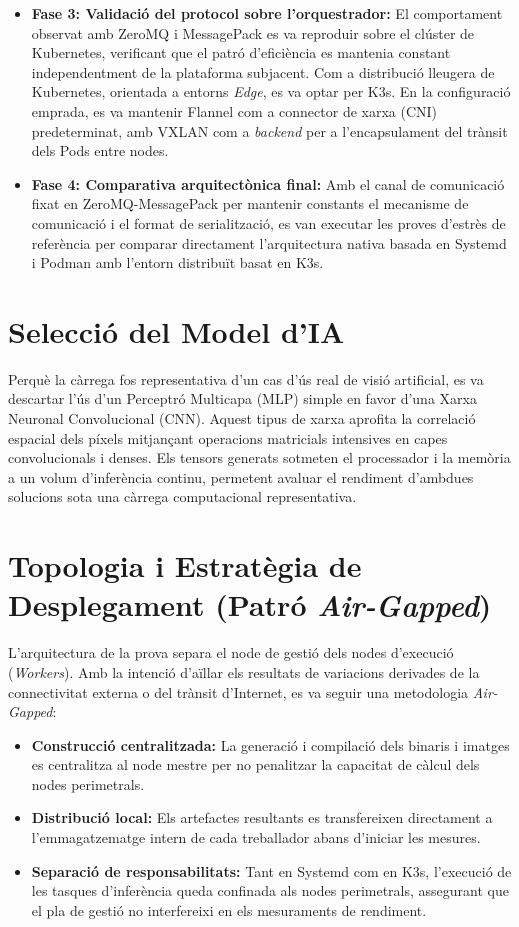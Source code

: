 \begin{itemize}
\begin{itemize}
    \end{itemize}
    \item \textbf{Fase 3: Validació del protocol sobre l'orquestrador:} El comportament observat amb ZeroMQ i MessagePack es va reproduir sobre el clúster de Kubernetes, verificant que el patró d'eficiència es mantenia constant independentment de la plataforma subjacent. Com a distribució lleugera de Kubernetes, orientada a entorns \textit{Edge}, es va optar per K3s. En la configuració emprada, es va mantenir Flannel com a connector de xarxa (CNI) predeterminat, amb VXLAN com a \textit{backend} per a l'encapsulament del trànsit dels Pods entre nodes.
    \item \textbf{Fase 4: Comparativa arquitectònica final:} Amb el canal de comunicació fixat en ZeroMQ-MessagePack per mantenir constants el mecanisme de comunicació i el format de serialització, es van executar les proves d'estrès de referència per comparar directament l'arquitectura nativa basada en Systemd i Podman amb l'entorn distribuït basat en K3s.
\end{itemize}

\section{Selecció del Model d'IA}
Perquè la càrrega fos representativa d'un cas d'ús real de visió artificial, es va descartar l'ús d'un Perceptró Multicapa (MLP) simple en favor d'una Xarxa Neuronal Convolucional (CNN). Aquest tipus de xarxa aprofita la correlació espacial dels píxels mitjançant operacions matricials intensives en capes convolucionals i denses. Els tensors generats sotmeten el processador i la memòria a un volum d'inferència continu, permetent avaluar el rendiment d'ambdues solucions sota una càrrega computacional representativa.

\section{Topologia i Estratègia de Desplegament (Patró \textit{Air-Gapped})}
L'arquitectura de la prova separa el node de gestió dels nodes d'execució (\textit{Workers}). Amb la intenció d'aïllar els resultats de variacions derivades de la connectivitat externa o del trànsit d'Internet, es va seguir una metodologia \textit{Air-Gapped}:

\begin{itemize}
    \item \textbf{Construcció centralitzada:} La generació i compilació dels binaris i imatges es centralitza al node mestre per no penalitzar la capacitat de càlcul dels nodes perimetrals.
    \item \textbf{Distribució local:} Els artefactes resultants es transfereixen directament a l'emmagatzematge intern de cada treballador abans d'iniciar les mesures.
    \item \textbf{Separació de responsabilitats:} Tant en Systemd com en K3s, l'execució de les tasques d'inferència queda confinada als nodes perimetrals, assegurant que el pla de gestió no interfereixi en els mesuraments de rendiment.
\end{itemize}

